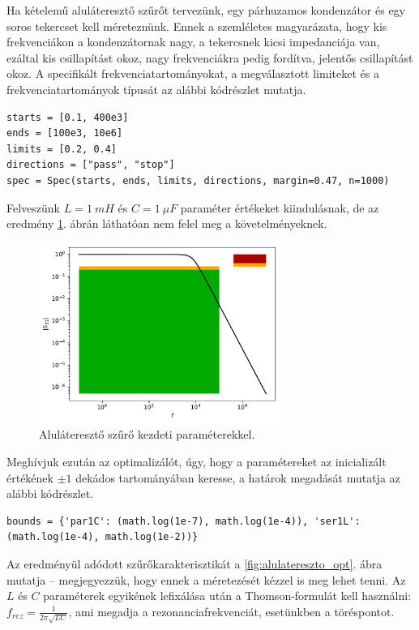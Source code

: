 		Ha kételemű aluláteresztő szűrőt tervezünk, egy párhuzamos kondenzátor és egy soros tekercset kell méreteznünk. Ennek a szemléletes magyarázata, hogy kis frekvenciákon a kondenzátornak nagy, a tekercsnek kicsi impedanciája van, ezáltal kis csillapítást okoz, nagy frekvenciákra pedig fordítva, jelentős csillapítást okoz. A specifikált frekvenciatartományokat, a megválasztott limiteket és a frekvenciatartományok típusát az alábbi kódrészlet mutatja.
		\begin{lstlisting}
starts = [0.1, 400e3]
ends = [100e3, 10e6]
limits = [0.2, 0.4]
directions = ["pass", "stop"]
spec = Spec(starts, ends, limits, directions, margin=0.47, n=1000)
		\end{lstlisting}
		Felveszünk $L = \SI{1}{mH}$ és $C = \SI{1}{\mu F}$ paraméter értékeket kiindulásnak, de az eredmény \ref{fig:alulatereszto}. ábrán láthatóan nem felel meg a követelményeknek.
		\begin{figure}[h!]
            \centering
            \includegraphics[width=0.7\textwidth]{alulatereszto.pdf}
            \caption{Aluláteresztő szűrő kezdeti paraméterekkel.}
            \label{fig:alulatereszto}
        \end{figure}
        Meghívjuk ezután az optimalizálót, úgy, hogy a paramétereket az inicializált értékének $\pm 1$ dekádos tartományában keresse, a határok megadását mutatja az alábbi kódrészlet.
        \begin{lstlisting}
bounds = {'par1C': (math.log(1e-7), math.log(1e-4)), 'ser1L': (math.log(1e-4), math.log(1e-2))}
        \end{lstlisting}
        Az eredményül adódott szűrőkarakterisztikát a \ref{fig:alulatereszto_opt}. ábra mutatja -- megjegyezzük, hogy ennek a méretezését kézzel is meg lehet tenni. Az $L$ és $C$ paraméterek egyikének lefixálása után a Thomson-formulát kell használni: $f_{rez} = \frac{1}{2\pi\sqrt{L C}}$, ami megadja a rezonanciafrekvenciát, esetünkben a töréspontot.
